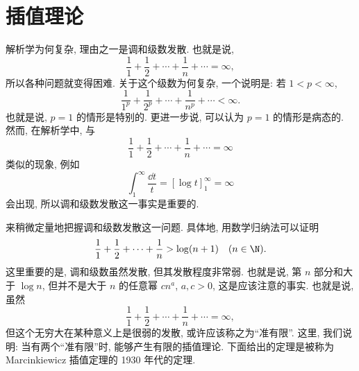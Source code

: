 \section{插值理论}\label{sec:1.4}




解析学为何复杂, 理由之一是调和级数发散. 也就是说,
\[
\frac{1}{1} + \frac{1}{2} + \cdots + \frac{1}{n} + \cdots = \infty,
\]
所以各种问题就变得困难. 关于这个级数为何复杂, 一个说明是: 若 $1 < p < \infty$,
\[
\frac{1}{1^{p}} + \frac{1}{2^{p}} + \cdots + \frac{1}{n^{p}} + \cdots < \infty.
\]
也就是说, $p = 1$ 的情形是特别的. 更进一步说, 可以认为 $p = 1$ 的情形是病态的. 然而, 在解析学中, 与
\[
\frac{1}{1} + \frac{1}{2} + \cdots + \frac{1}{n} + \cdots = \infty
\]
类似的现象, 例如
\[
\int_{1}^{\infty} \frac{\dd t}{t} = [\log t]_{1}^{\infty} = \infty
\]
会出现, 所以调和级数发散这一事实是重要的.

来稍微定量地把握调和级数发散这一问题. 具体地, 用数学归纳法可以证明
\[
\frac{1}{1} + \frac{1}{2} + \cdots + \frac{1}{n} > \log(n+1) \quad (n \in \N).
\]
这里重要的是, 调和级数虽然发散, 但其发散程度非常弱. 也就是说, 第 $n$ 部分和大于 $\log n$, 但并不是大于 $n$ 的任意幂 $cn^{a}$, $a, c > 0$, 这是应该注意的事实. 也就是说, 虽然
\[
\frac{1}{1} + \frac{1}{2} + \cdots + \frac{1}{n} + \cdots = \infty,
\]
但这个无穷大在某种意义上是很弱的发散, 或许应该称之为``准有限''. 这里, 我们说明: 当有两个``准有限''时, 能够产生有限的插值理论. 下面给出的定理是被称为 Marcinkiewicz 插值定理的 1930 年代的定理.

